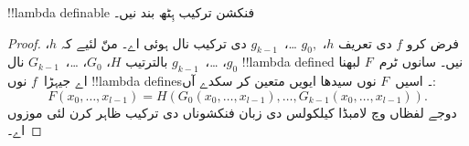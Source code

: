 \documentclass[../../../include/open-logic-section]{subfiles}
\begin{document}

\begin{lem}
!!{lambda definable} فنکشن ترکیب ہِٹھ بند نیں۔
\end{lem}

\begin{proof}
فرض کرو $f$ دی تعریف $h$، $g_0,$
\dots،~$g_{k-1}$ دی ترکیب نال ہوئی اے۔ منّ لئیے کہ $h$، $g_0$،
\dots،~$g_{k-1}$ بالترتیب $H$، $G_0$، \dots،~$G_{k-1}$ نال
!!{lambda defined} نیں۔ سانوں ٹرم~$F$ لبھنا اے جیہڑا~$f$ نوں
!!{lambda define}s۔ اسیں~$F$ نوں سیدھا ایویں متعین کر سکدے آں:
\[
F(x_0, \dots, x_{l-1}) = H(G_0(x_0, \dots, x_{l-1}),
\dots, G_{k-1}(x_0, \dots, x_{l-1})).
\]
دوجے لفظاں وچ لامبڈا کیلکولس دی زبان فنکشوناں دی ترکیب ظاہر کرن
لئی موزوں اے۔
\end{proof}
\end{document}
